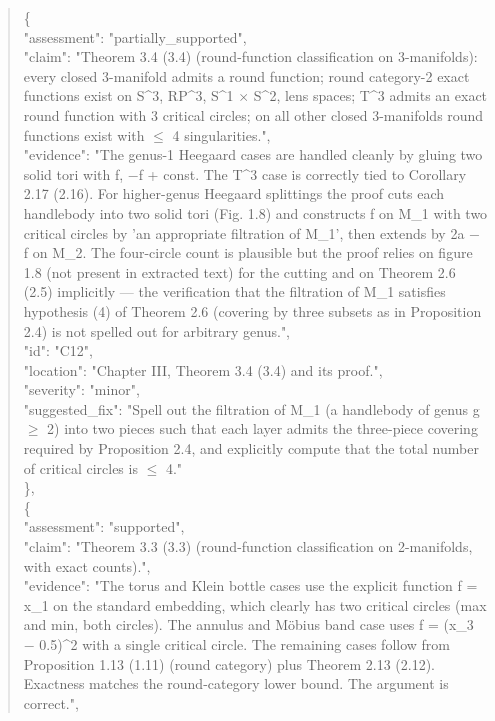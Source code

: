 \documentclass[11pt]{article}
\begin{document}
\begin{quote}
    \{\\
      "assessment": "partially\_supported",\\
      "claim": "Theorem 3.4 (3.4) (round-function classification on 3-manifolds): every closed 3-manifold admits a round function; round category-2 exact functions exist on S\^{}3, RP\^{}3, S\^{}1 \ensuremath{\times} S\^{}2, lens spaces; T\^{}3 admits an exact round function with 3 critical circles; on all other closed 3-manifolds round functions exist with \ensuremath{\le} 4 singularities.",\\
      "evidence": "The genus-1 Heegaard cases are handled cleanly by gluing two solid tori with f, \ensuremath{-}f + const. The T\^{}3 case is correctly tied to Corollary 2.17 (2.16). For higher-genus Heegaard splittings the proof cuts each handlebody into two solid tori (Fig. 1.8) and constructs f on M\_1 with two critical circles by 'an appropriate filtration of M\_1', then extends by 2a \ensuremath{-} f on M\_2. The four-circle count is plausible but the proof relies on figure 1.8 (not present in extracted text) for the cutting and on Theorem 2.6 (2.5) implicitly --- the verification that the filtration of M\_1 satisfies hypothesis (4) of Theorem 2.6 (covering by three subsets as in Proposition 2.4) is not spelled out for arbitrary genus.",\\
      "id": "C12",\\
      "location": "Chapter III, Theorem 3.4 (3.4) and its proof.",\\
      "severity": "minor",\\
      "suggested\_fix": "Spell out the filtration of M\_1 (a handlebody of genus g \ensuremath{\ge} 2) into two pieces such that each layer admits the three-piece covering required by Proposition 2.4, and explicitly compute that the total number of critical circles is \ensuremath{\le} 4."\\
    \},\\
    \{\\
      "assessment": "supported",\\
      "claim": "Theorem 3.3 (3.3) (round-function classification on 2-manifolds, with exact counts).",\\
      "evidence": "The torus and Klein bottle cases use the explicit function f = x\_1 on the standard embedding, which clearly has two critical circles (max and min, both circles). The annulus and Möbius band case uses f = (x\_3 \ensuremath{-} 0.5)\^{}2 with a single critical circle. The remaining cases follow from Proposition 1.13 (1.11) (round category) plus Theorem 2.13 (2.12). Exactness matches the round-category lower bound. The argument is correct.",\\

\end{quote}
\end{document}
